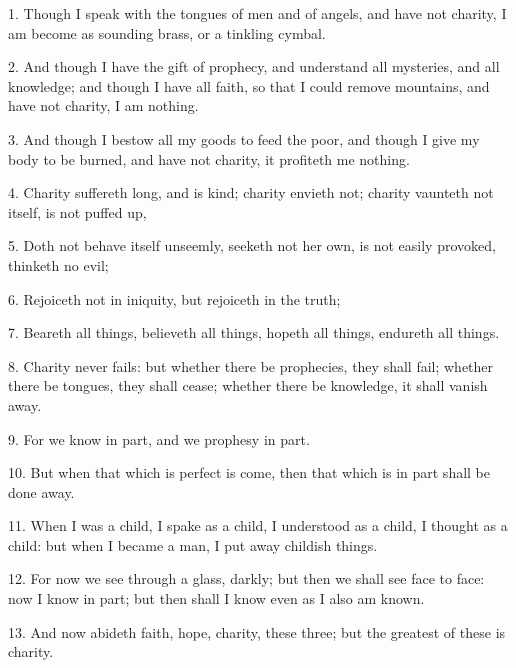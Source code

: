 \setcounter{footnote}{0}

1. Though I speak with the tongues of men and of angels, and have not charity, I
am become as sounding brass, or a tinkling cymbal.

2. And though I have the gift of prophecy, and understand all mysteries, and all
knowledge; and though I have all faith, so that I could remove mountains, and have
not charity, I am nothing.

3. And though I bestow all my goods to feed the poor, and though I give my body
to be burned, and have not charity, it profiteth me nothing.

4. Charity suffereth long, and is kind; charity envieth not; charity vaunteth not
itself, is not puffed up,

5. Doth not behave itself unseemly, seeketh not her own, is not easily provoked,
thinketh no evil;

6. Rejoiceth not in iniquity, but rejoiceth in the truth;

7. Beareth all things, believeth all things, hopeth all things, endureth all things.

8. Charity never fails: but whether there be prophecies, they shall fail; whether
there be tongues, they shall cease; whether there be knowledge, it shall vanish
away.

9. For we know in part, and we prophesy in part.

10. But when that which is perfect is come, then that which is in part shall be
done away.

11. When I was a child, I spake as a child, I understood as a child, I thought as
a child: but when I became a man, I put away childish things.

12. For now we see through a glass, darkly; but then we shall see face to face: now I know in
part; but then shall I know even as I also am known.

13. And now abideth faith, hope, charity, these three; but the greatest of these
is charity.

